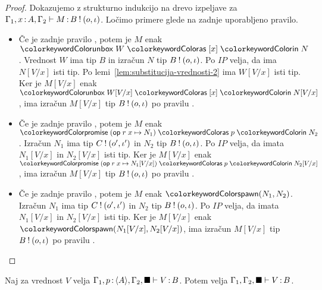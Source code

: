 \begin{proof}
	Dokazujemo z strukturno indukcijo na drevo izpeljave za $\Gamma_1, x \mathinner{:} A, \Gamma_2 \vdash M \mathinner{:} B \mathbin{!} (o, \iota)$.
	Ločimo primere glede na zadnje uporabljeno pravilo.
	
	\begin{itemize}
		\item Če je zadnje pravilo , potem je $M$ enak $\tmunbox{W}{x}{N}$. Vrednost $W$ ima tip $B$ in izračun $N$ tip $B \mathbin{!} (o, \iota)$.
		Po $IP$ velja, da ima $N[V/x]$ isti tip. Po lemi~\ref{lem:substitucija-vrednosti-2} ima $W[V/x]$ isti tip. Ker je $M[V/x]$ enak $\tmunbox{W[V/x]}{x}{N[V/x]}$, ima izračun $M[V/x]$ tip $B \mathbin{!} (o, \iota)$ po pravilu .
		
		\item Če je zadnje pravilo , potem je $M$ enak $\tmwithrec{op}{r}{x}{N_1}{p}{N_2}$. Izračun $N_1$ ima tip $C \mathbin{!} (o', \iota')$ in $N_2$ tip $B \mathbin{!} (o, \iota)$.
		Po $IP$ velja, da imata $N_1[V/x]$ in $N_2[V/x]$ isti tip. Ker je $M[V/x]$ enak $\tmwithrec{op}{r}{x}{N_1[V/x]}{p}{N_2[V/x]}$, ima izračun $M[V/x]$ tip $B \mathbin{!} (o, \iota)$ po pravilu .
		
		\item Če je zadnje pravilo , potem je $M$ enak $\tmspawn{N_1}{N_2}$. Izračun $N_1$ ima tip $C \mathbin{!} (o', \iota')$ in $N_2$ tip $B \mathbin{!} (o, \iota)$.
		Po $IP$ velja, da imata $N_1[V/x]$ in $N_2[V/x]$ isti tip. Ker je $M[V/x]$ enak $\tmspawn{N_1[V/x]}{N_2[V/x]}$, ima izračun $M[V/x]$ tip $B \mathbin{!} (o, \iota)$ po pravilu .	
	\end{itemize}
	
\end{proof}

\begin{lema}\label{lem:strengthening-values-bb}
	Naj za vrednost $V$ velja $\Gamma_1, p \mathinner{:} \langle A \rangle, \Gamma_2, \blacksquare \vdash V \mathinner{:} B$. Potem velja $\Gamma_1, \Gamma_2, \blacksquare \vdash V \mathinner{:} B$.
\end{lema}

